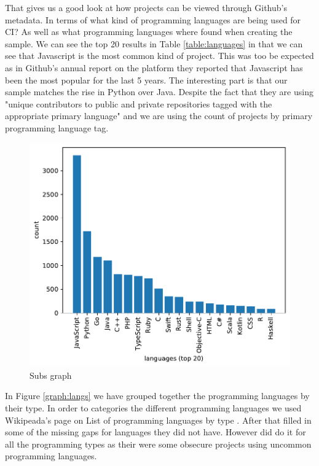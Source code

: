 \documentclass[twoside,12pt,titlepage,a4paper]{article}
\begin{document}
That gives us a good look at how projects can be viewed through Github's metadata. In terms of what kind of programming languages are being used for CI? As well as what programming languages where found when creating the sample. We can see the top 20 results in Table \ref{table:languages} in that we can see that Javascript is the most common kind of project. This was too be expected as in Github's annual report \cite{GithubOctoverseResults} on the platform they reported that Javascript has been the most popular for the last 5 years. The interesting part is that our sample matches the rise in Python over Java. Despite the fact that they are using "unique contributors to public and private repositories tagged with the appropriate primary language" and we are using the count of projects by primary programming language tag. 


% 

\begin{figure}[!h]
  \centering
  \includegraphics[width=.8\textwidth]{../src/results/languages-topn.pdf}
  \caption{Subs graph}
  \label{graph_percentage_subs}
\end{figure}

In Figure \ref{graph:langs} we have grouped together the programming languages by their type. In order to categories the different programming languages we used Wikipeada's page on List of programming languages by type \citet{2020Wiki}. After that filled in some of the missing gaps for languages they did not have. However did do it for all the programming types as their were some obsecure projects using uncommon programming languages.
\end{document}
